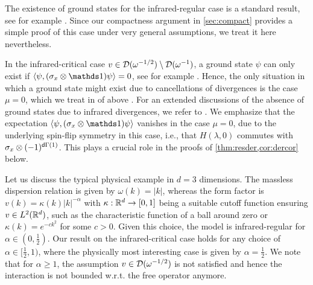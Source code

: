 \documentclass[a4paper,12pt,oneside]{article}
\begin{document}
\begin{rem}
	The existence of ground states for the infrared-regular case is a standard result, see for example \cite{Spohn.1989,BachFroehlichSigal.1998b,Gerard.2000}. 
	Since our compactness argument in \cref{sec:compact} provides a simple proof of this case under very general assumptions, we treat it here nevertheless.
\end{rem}
\begin{rem}\label{rem:absence}
	In the infrared-critical case $v\in{\mathcal D}(\omega^{-1/2})\setminus {\mathcal D}(\omega^{-1})$, a ground state $\psi$ can only exist if $\braket{\psi,(\sigma_x\otimes\Id)\psi}=0$, see for example \cite{AraiHirokawaHiroshima.1999}. Hence, the only situation in which a ground state might exist due to cancellations of divergences is the case $\mu=0$, which we treat in  of above . For an extended discussions of the absence of ground states due to infrared divergences, we refer to \cite{Spohn.1998,LorincziMinlosSpohn.2002,Hinrichs.2022}. We emphasize that the expectation $\braket{\psi,(\sigma_x\otimes\Id)\psi}$ vanishes in the case $\mu=0$, due to the underlying spin-flip symmetry in this case, i.e., that $H(\lambda,0)$ commutes with $\sigma_x\otimes(-1)^{{\mathsf d}\Gamma(1)}$. This plays a crucial role in the proofs of \cref{thm:resder,cor:dercor} below.
\end{rem}
\begin{ex} Let us discuss the typical physical example in $d=3$ dimensions. The massless dispersion relation is given by $\omega(k)=|k|$, whereas the form factor is $v(k)=\kappa(k)|k|^{-\alpha}$ with $\kappa:{\mathbb R}^d\to[0,1]$ being a suitable cutoff function ensuring $v\in L^2({\mathbb R}^d)$, such as the characteristic function of a ball around zero or $\kappa(k)=e^{-ck^2}$ for some $c>0$. Given this choice, the model is infrared-regular for $\alpha\in(0,\frac 12)$. Our result on the infrared-critical case holds for any choice of $\alpha\in[\frac 12,1)$, where the physically most interesting case is given by $\alpha=\frac 12$. We note that for $\alpha\ge 1$, the assumption $v\in{\mathcal D}(\omega^{-1/2})$ is not satisfied and hence the interaction is not bounded w.r.t. the free operator anymore.
\end{ex}
\end{document}
